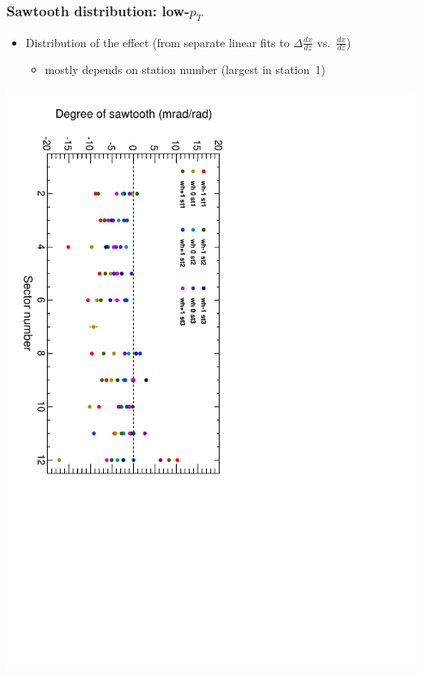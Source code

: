 \documentclass[compress]{beamer}
\begin{document}
\begin{frame}
\frametitle{Sawtooth distribution: low-$p_T$}

\begin{itemize}
\item Distribution of the effect (from separate linear fits to $\Delta \frac{dx}{dz}$ vs.\ $\frac{dx}{dz}$)
\begin{itemize}
\item mostly depends on station number (largest in station~1)
\end{itemize}
\end{itemize}

\includegraphics[height=\linewidth, angle=90]{sawtooth_bysector_lowp.pdf}
\end{frame}
\end{document}
